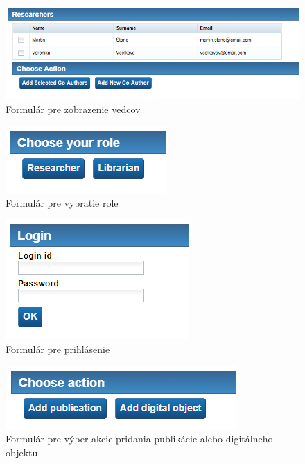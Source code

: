 \documentclass[10pt,oneside,slovak,a4paper]{article}
\begin{document}
\begin{figure} [H]
\centering
\includegraphics[scale=0.4]{forms/Coach for displaying researchers.png} 
\caption{Formulár pre zobrazenie vedcov}
\end{figure}

\begin{figure} [H]
\centering
\includegraphics[scale=0.4]{forms/Coach for choosing role.png} 
\caption{Formulár pre vybratie role}
\end{figure}

\begin{figure} [H]
\centering
\includegraphics[scale=0.4]{forms/Coach for login.png} 
\caption{Formulár pre prihlásenie}
\end{figure}

\begin{figure} [H]
\centering
\includegraphics[scale=0.4]{forms/Coach for research action.png} 
\caption{Formulár pre výber akcie pridania publikácie alebo digitálneho objektu}
\end{figure}
\end{document}
